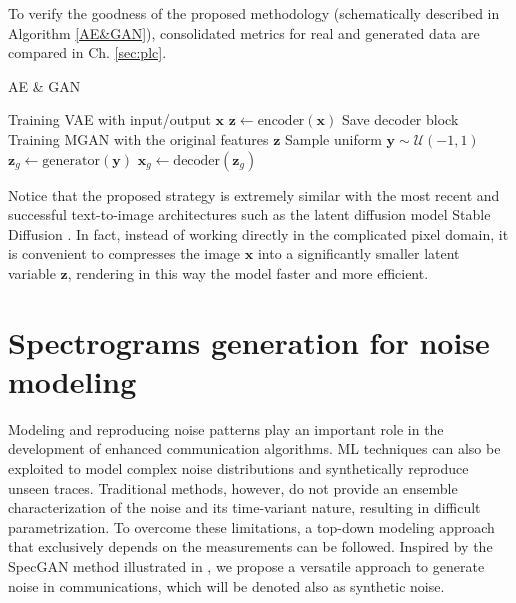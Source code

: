 To verify the goodness of the proposed methodology (schematically described in Algorithm \ref{AE&GAN}), consolidated metrics for real and generated data are compared in Ch. \ref{sec:plc}.

\begin{algorithm}[b]
\caption{AE \& GAN}\label{AE&GAN}
\begin{algorithmic}[1]
\BState Training VAE with input/output $\mathbf{x}$
\State \hspace{3mm}$\mathbf{z} \gets \text{encoder}(\mathbf{x})$
\State \hspace{3mm}Save decoder block
\BState Training MGAN with the original features $\mathbf{z}$ 
\State \hspace{3mm}Sample uniform $\mathbf{y}\sim \mathcal{U}(-1,1)$
\State \hspace{3mm}$\mathbf{z}_g \gets \text{generator}(\mathbf{y})$
\BState $\mathbf{x}_g \gets \text{decoder}(\mathbf{z}_g)$
\end{algorithmic}
\end{algorithm}

Notice that the proposed strategy is extremely similar with the most recent and successful text-to-image architectures such as the latent diffusion model Stable Diffusion \cite{SD2021}. In fact, instead of working directly in the complicated pixel domain, it is convenient to compresses the image $\mathbf{x}$ into a significantly smaller latent variable $\mathbf{z}$, rendering in this way the model faster and more efficient.

\section{Spectrograms generation for noise modeling}
\label{sec:medium_channelsynthesis}
Modeling and reproducing noise patterns play an important role in the development of enhanced communication algorithms. 
ML techniques can also be exploited to model complex noise distributions and synthetically reproduce unseen traces. 
Traditional methods, however, do not provide an ensemble characterization of the noise and its
time-variant nature, resulting in difficult parametrization. 
To overcome these limitations, a top-down modeling approach that exclusively depends on the measurements can be followed. Inspired by the SpecGAN method illustrated
in \cite{donahue2018adversarial}, we propose a versatile approach to generate noise in communications, which will be denoted also as synthetic noise. 

